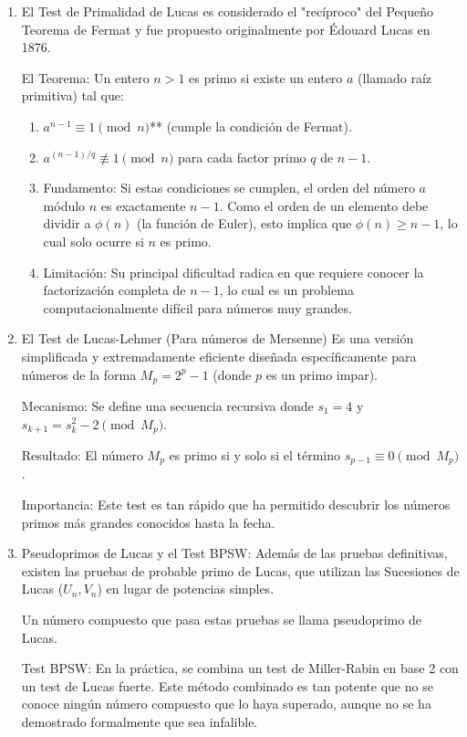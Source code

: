 \begin{enumerate}
    \item El Test de Primalidad de Lucas
es considerado el "recíproco" del Pequeño Teorema de Fermat y fue propuesto originalmente por Édouard Lucas en 1876.

El Teorema: Un entero $n > 1$ es primo si existe un entero $a$ (llamado raíz primitiva) tal que:
\begin{enumerate}
    \item  $a^{n-1} \equiv 1 \pmod n$** (cumple la condición de Fermat).
    \item $a^{(n-1)/q} \not\equiv 1 \pmod n$ para cada factor primo $q$ de $n-1$.
    \item Fundamento: Si estas condiciones se cumplen, el orden del número $a$ módulo $n$ es exactamente $n-1$. Como el orden de un elemento debe dividir a $\phi(n)$ (la función de Euler), esto implica que $\phi(n) \geq n-1$, lo cual solo ocurre si $n$ es primo.
    \item  Limitación: Su principal dificultad radica en que requiere conocer la factorización completa de $n-1$, lo cual es un problema computacionalmente difícil para números muy grandes.
\end{enumerate}

\item El Test de Lucas-Lehmer (Para números de Mersenne)
Es una versión simplificada y extremadamente eficiente diseñada específicamente para números de la forma $M_p = 2^p - 1$ (donde $p$ es un primo impar).

Mecanismo: Se define una secuencia recursiva donde $s_1 = 4$ y $s_{k+1} = s_k^2 - 2 \pmod{M_p}$.

Resultado: El número $M_p$ es primo si y solo si el término $s_{p-1} \equiv 0 \pmod{M_p}$.

Importancia: Este test es tan rápido que ha permitido descubrir los números primos más grandes conocidos hasta la fecha.

\item Pseudoprimos de Lucas y el Test BPSW:
Además de las pruebas definitivas, existen las pruebas de probable primo de Lucas, que utilizan las Sucesiones de Lucas ($U_n, V_n$) en lugar de potencias simples.

Un número compuesto que pasa estas pruebas se llama pseudoprimo de Lucas.

Test BPSW: En la práctica, se combina un test de Miller-Rabin en base 2 con un test de Lucas fuerte. Este método combinado es tan potente que no se conoce ningún número compuesto que lo haya superado, aunque no se ha demostrado formalmente que sea infalible.
\end{enumerate}

